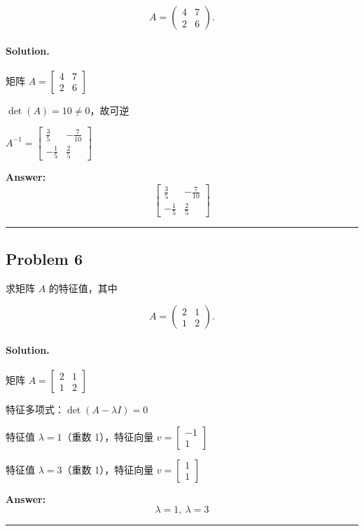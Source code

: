 \documentclass[12pt, a4paper]{ctexart}
\newcommand{\problem}[1]{\subsection*{Problem #1}}
\newcommand{\solution}{\paragraph{Solution.}}
\begin{document}
$$A = \begin{pmatrix} 4 & 7 \\ 2 & 6 \end{pmatrix}.$$

\solution

矩阵 $A = \left[\begin{matrix}4 & 7\\2 & 6\end{matrix}\right]$

$\det(A) = 10 \neq 0$，故可逆

$A^{-1} = \left[\begin{matrix}\frac{3}{5} & - \frac{7}{10}\\- \frac{1}{5} & \frac{2}{5}\end{matrix}\right]$

\textbf{Answer:}
\[\boxed{\left[\begin{matrix}\frac{3}{5} & - \frac{7}{10}\\- \frac{1}{5} & \frac{2}{5}\end{matrix}\right]}\]

\vspace{1em}
\hrule
\vspace{1em}

\problem{6}

求矩阵 $A$ 的特征值，其中

$$A = \begin{pmatrix} 2 & 1 \\ 1 & 2 \end{pmatrix}.$$

\solution

矩阵 $A = \left[\begin{matrix}2 & 1\\1 & 2\end{matrix}\right]$

特征多项式：$\det(A - \lambda I) = 0$

特征值 $\lambda = 1$（重数 1），特征向量 $v = \left[\begin{matrix}-1\\1\end{matrix}\right]$

特征值 $\lambda = 3$（重数 1），特征向量 $v = \left[\begin{matrix}1\\1\end{matrix}\right]$

\textbf{Answer:}
\[\boxed{\lambda = 1,\ \lambda = 3}\]

\vspace{1em}
\hrule
\vspace{1em}
\end{document}
